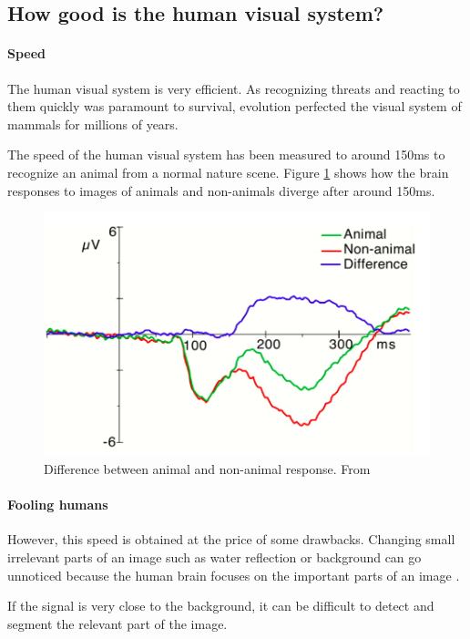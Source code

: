 \documentclass{article}
\begin{document}
\subsection{How good is the human visual system?}
\paragraph{Speed}
The human visual system is very efficient. As recognizing threats and reacting to them quickly was paramount to survival, evolution perfected the visual system of mammals for millions of years.

The speed of the human visual system has been measured \cite{speed} to around 150ms to recognize an animal from a normal nature scene. Figure \ref{fig:speed} shows how the brain responses to images of animals and non-animals diverge after around 150ms.

\begin{figure}[h]
\begin{center}
\centerline{\includegraphics[width=0.8\columnwidth]{speed.png}}
\caption{Difference between animal and non-animal response. From \cite{speed}}
\label{fig:speed}
\end{center}
\end{figure} 


\paragraph{Fooling humans}
However, this speed is obtained at the price of some drawbacks. Changing small irrelevant parts of an image such as water reflection or background can go unnoticed because the human brain focuses on the important parts of an image \cite{failure}.

If the signal is very close to the background, it can be difficult to detect and segment the relevant part of the image.
\end{document}
